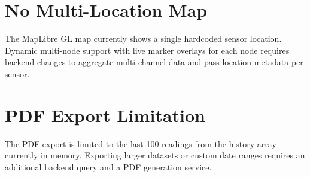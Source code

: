 \section{No Multi-Location Map}

The MapLibre GL map currently shows a single hardcoded sensor location. Dynamic multi-node support with live marker overlays for each node requires backend changes to aggregate multi-channel data and pass location metadata per sensor.

\section{PDF Export Limitation}

The PDF export is limited to the last 100 readings from the history array currently in memory. Exporting larger datasets or custom date ranges requires an additional backend query and a PDF generation service.
